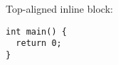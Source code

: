 \documentclass{article}
\begin{document}
Top-aligned inline block:
\begin{verbatim}
int main() {
  return 0;
}
\end{verbatim}
\end{document}
